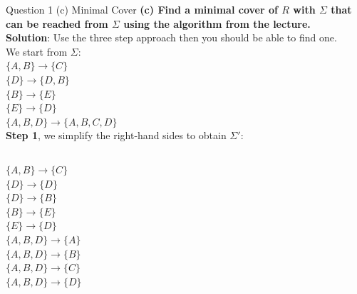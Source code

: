 \begin{frame}[fragile]{Question 1 (c) Minimal Cover}
	\textbf{(c) Find a minimal cover of $R$ with $\Sigma$ that can be reached from $\Sigma$ using the algorithm from the lecture.}\\ \vspace{5pt}
	\textbf{Solution}: Use the three step approach then you should be able to find one.\\\vspace{5pt}
	We start from $\Sigma$: \\\vspace{5pt}
	$\{A, B\} \rightarrow \{C\}$\\
	$\{D\} \rightarrow \{D, B\}$\\
	$\{B\} \rightarrow \{E\}$\\
	$\{E\} \rightarrow \{D\}$\\
	$\{A, B, D\} \rightarrow \{A, B, C, D\}$\\\vspace{5pt}
	\textbf{Step 1}, we simplify the right-hand sides to obtain $\Sigma'$:\\\vspace{3pt}
	\begin{columns}[t]
		$\{A, B\} \rightarrow \{C\}$\\
		\underline{$\{D\} \rightarrow \{D\}$}\\
		\underline{$\{D\} \rightarrow \{B\}$}\\
		$\{B\} \rightarrow \{E\}$\\
		$\{E\} \rightarrow \{D\}$\\
		\underline{$\{A, B, D\} \rightarrow \{A\}$}\\	
		\underline{$\{A, B, D\} \rightarrow \{B\}$}\\	
		\underline{$\{A, B, D\} \rightarrow \{C\}$}\\	
		\underline{$\{A, B, D\} \rightarrow \{D\}$}\\
	\end{columns}
\end{frame}


